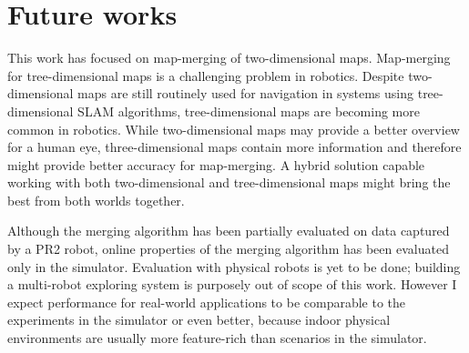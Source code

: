 \chapter{Future works}
\label{sec:future-works}

This work has focused on map-merging of two-dimensional maps. Map-merging for tree-dimensional maps is a challenging problem in robotics. Despite two-dimensional maps are still routinely used for navigation in systems using tree-dimensional \gls{SLAM} algorithms, tree-dimensional maps are becoming more common in robotics. While two-dimensional maps may provide a better overview for a human eye, three-dimensional maps contain more information and therefore might provide better accuracy for map-merging. A hybrid solution capable working with both two-dimensional and tree-dimensional maps might bring the best from both worlds together.

Although the merging algorithm has been partially evaluated on data captured by a PR2 robot, online properties of the merging algorithm has been evaluated only in the simulator. Evaluation with physical robots is yet to be done; building a multi-robot exploring system is purposely out of scope of this work. However I expect performance for real-world applications to be comparable to the experiments in the simulator or even better, because indoor physical environments are usually more feature-rich than scenarios in the simulator.
